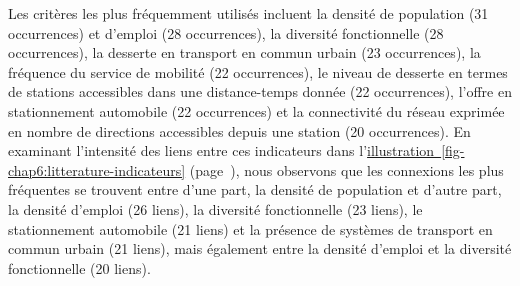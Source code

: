 \begin{refsegment}
Les critères les plus fréquemment utilisés incluent la densité de population (31 occurrences) et d'emploi (28 occurrences), la diversité fonctionnelle (28 occurrences), la desserte en transport en commun urbain (23 occurrences), la fréquence du service de mobilité (22 occurrences), le niveau de desserte en termes de stations accessibles dans une distance-temps donnée (22 occurrences), l'offre en stationnement automobile (22 occurrences) et la connectivité du réseau exprimée en nombre de directions accessibles depuis une station (20 occurrences). En examinant l'intensité des liens entre ces indicateurs dans l'\hyperref[fig-chap6:litterature-indicateurs]{illustration~\ref{fig-chap6:litterature-indicateurs}} (page~\pageref{fig-chap6:litterature-indicateurs}), nous observons que les connexions les plus fréquentes se trouvent entre d'une part, la densité de population et d'autre part, la densité d'emploi (26 liens), la diversité fonctionnelle (23 liens), le stationnement automobile (21 liens) et la présence de systèmes de transport en commun urbain (21 liens), mais également entre la densité d'emploi et la diversité fonctionnelle (20 liens).%


\end{refsegment}
